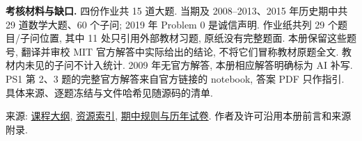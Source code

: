 \textbf{考核材料与缺口.} 四份作业共 15 道大题. 当期及 2008--2013、2015 年历史期中共 29 道数学大题、60 个子问; 2019 年 Problem 0 是诚信声明. 作业纸共列 29 个题目/子问位置, 其中 11 处只引用外部教材习题, 原纸没有完整题面. 本册保留这些题号, 翻译并审校 MIT 官方解答中实际给出的结论, 不将它们冒称教材原题全文. 教材内未见的子问不计入统计. 2009 年无官方解答, 本册相应解答明确标为 AI 补写. PS1 第 2、3 题的完整官方解答来自官方链接的 notebook, 答案 PDF 只作指引. 具体来源、逐题冻结与文件哈希见随源码的清单.

来源: \href{https://ocw.mit.edu/courses/18-335j-introduction-to-numerical-methods-spring-2019/pages/syllabus/}{课程大纲}, \href{https://ocw.mit.edu/courses/18-335j-introduction-to-numerical-methods-spring-2019/pages/resource-index/}{资源索引}, \href{https://ocw.mit.edu/courses/18-335j-introduction-to-numerical-methods-spring-2019/pages/week-9/}{期中规则与历年试卷}. 作者及许可沿用本册前言和来源附录.
